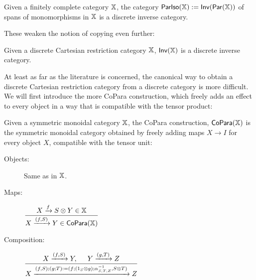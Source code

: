 \begin{lemma}
Given a finitely complete category $\mathbb{X}$, the category  $\mathsf{ParIso}(\mathbb{X}):=\mathsf{Inv}(\mathsf{Par}(\mathbb{X}))$ of spans of monomorphisms in $\mathbb{X}$ is a discrete inverse category.
\end{lemma}
These weaken the notion of copying even further:
\begin{lemma}
Given a discrete Cartesian restriction category $\mathbb{X}$, $\mathsf{Inv}(\mathbb{X})$ is a discrete inverse category.
\end{lemma}
At least as far as the literature is concerned, the canonical way to obtain a discrete Cartesian restriction category from a discrete category is more difficult.  We will first introduce the more CoPara construction, which freely adds an effect to every object in a way that is compatible with the tensor product:
\begin{definition}
Given a symmetric monoidal category $\mathbb{X}$, the CoPara construction, ${\sf CoPara}(\mathbb{X})$ is the symmetric monoidal category obtained by freely adding maps $X\to I$ for every object $X$, compatible with the tensor unit:
\begin{description}
\item[Objects:] Same as in $\mathbb{X}$.
\item[Maps:]  
\hfil $
\dfrac{ X\xrightarrow{f}  S\otimes Y \in \mathbb{X}           }
         { X\xrightarrow{(f,S)} Y \in  {\sf CoPara}(\mathbb{X}) }
$
\item[Composition:]
\hfil $
\dfrac{
	X\xrightarrow{(f,S)} Y , \hspace*{.5cm} Y\xrightarrow{(g,T)} Z }
         {X\xrightarrow{
		(f,S);(g;T) := (f;(1_S \otimes g);\alpha^{-1}_{S,T,Z} ,S\otimes T)}Z} 
$



\end{description}
\end{definition}
